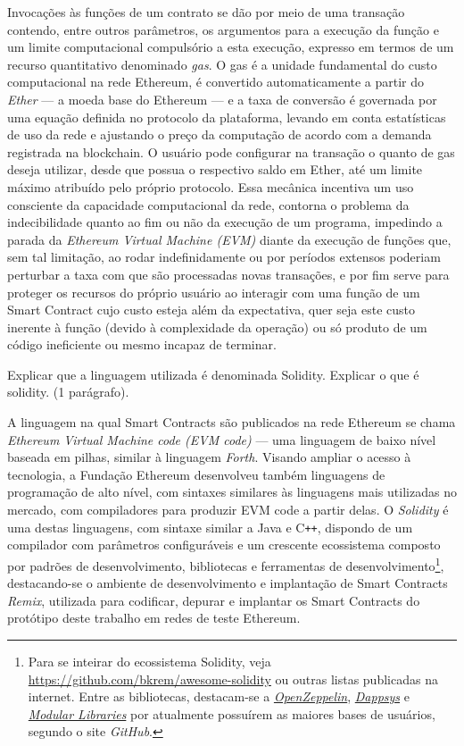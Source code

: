 \documentclass[a4paper,11pt]{article}
\begin{document}
Invocações às funções de um contrato se dão por meio de uma transação contendo, entre outros parâmetros, os argumentos para a execução da função e um limite computacional compulsório a esta execução, expresso em termos de um recurso quantitativo denominado \emph{gas}.
O gas é a unidade fundamental do custo computacional na rede Ethereum, é convertido automaticamente a partir do \emph{Ether} --- a moeda base do Ethereum --- e a taxa de conversão é governada por uma equação definida no protocolo da plataforma, levando em conta estatísticas de uso da rede e ajustando o preço da computação de acordo com a demanda registrada na blockchain.
O usuário pode configurar na transação o quanto de gas deseja utilizar, desde que possua o respectivo saldo em Ether, até um limite máximo atribuído pelo próprio protocolo.
Essa mecânica incentiva um uso consciente da capacidade computacional da rede, contorna o problema da indecibilidade quanto ao fim ou não da execução de um programa, impedindo a parada da \emph{Ethereum Virtual Machine (EVM)} diante da execução de funções que, sem tal limitação, ao rodar indefinidamente ou por períodos extensos poderiam perturbar a taxa com que são processadas novas transações, e por fim serve para proteger os recursos do próprio usuário ao interagir com uma função de um Smart Contract cujo custo esteja além da expectativa, quer seja este custo inerente à função (devido à complexidade da operação) ou só produto de um código ineficiente ou mesmo incapaz de terminar.

{\color{ForestGreen}Explicar que a linguagem utilizada é denominada Solidity. Explicar o que é solidity. (1 parágrafo).}

A linguagem na qual Smart Contracts são publicados na rede Ethereum se chama \emph{Ethereum Virtual Machine code (EVM code)} --- uma linguagem de baixo nível baseada em pilhas, similar à linguagem \emph{Forth}.
Visando ampliar o acesso à tecnologia, a Fundação Ethereum desenvolveu também linguagens de programação de alto nível, com sintaxes similares às linguagens mais utilizadas no mercado, com compiladores para produzir EVM code a partir delas. O \emph{Solidity} é uma destas linguagens, com sintaxe similar a Java e C\texttt{++}, dispondo de um compilador com parâmetros configuráveis e um crescente ecossistema composto por padrões de desenvolvimento, bibliotecas e ferramentas de desenvolvimento\footnote{Para se inteirar do ecossistema Solidity, veja \href{https://github.com/bkrem/awesome-solidity}{https://github.com/bkrem/awesome-solidity} ou outras listas publicadas na internet. Entre as bibliotecas, destacam-se a \emph{\href{https://openzeppelin.com/}{OpenZeppelin}}, \emph{\href{https://github.com/dapphub/dappsys}{Dappsys}} e \emph{\href{https://github.com/modular-network/ethereum-libraries}{Modular Libraries}} por atualmente possuírem as maiores bases de usuários, segundo o site \emph{GitHub}.}, destacando-se o ambiente de desenvolvimento e implantação de Smart Contracts \emph{Remix}, utilizada para codificar, depurar e implantar os Smart Contracts do protótipo deste trabalho em redes de teste Ethereum.
\end{document}
